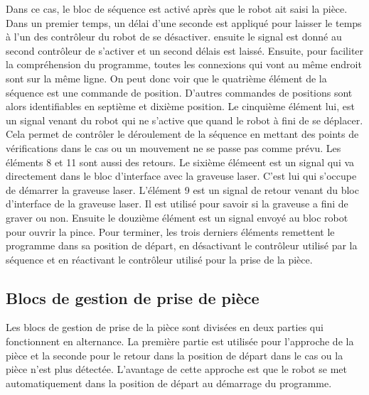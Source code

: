 Dans ce cas, le bloc de séquence est activé après que le robot ait saisi la pièce. Dans un premier temps, un délai d'une seconde est appliqué pour laisser le temps à l'un des contrôleur du robot de se désactiver. ensuite le signal est donné au second contrôleur de s'activer et un second délais est laissé. Ensuite, pour faciliter la compréhension du programme, toutes les connexions qui vont au même endroit sont sur la même ligne. On peut donc voir que le quatrième élément de la séquence est une commande de position. D'autres commandes de positions sont alors identifiables en septième et dixième position. Le cinquième élément lui, est un signal venant du robot qui ne s'active que quand le robot à fini de se déplacer. Cela permet de contrôler le déroulement de la séquence en mettant des points de vérifications dans le cas ou un mouvement ne se passe pas comme prévu. Les éléments 8 et 11 sont aussi des retours. Le sixième élémeent est un signal qui va directement dans le bloc d'interface avec la graveuse laser. C'est lui qui s'occupe de démarrer la graveuse laser. L'élément 9 est un signal de retour venant du bloc d'interface de la graveuse laser. Il est utilisé pour savoir si la graveuse a fini de graver ou non. Ensuite le douzième élément est un signal envoyé au bloc robot pour ouvrir la pince. Pour terminer, les trois derniers éléments remettent le programme dans sa position de départ, en désactivant le contrôleur utilisé par la séquence et en réactivant le contrôleur utilisé pour la prise de la pièce.

\subsection{Blocs de gestion de prise de pièce}

Les blocs de gestion de prise de la pièce sont divisées en deux parties qui fonctionnent en alternance. La première partie est utilisée pour l'approche de la pièce et la seconde pour le retour dans la position de départ dans le cas ou la pièce n'est plus détectée. L'avantage de cette approche est que le robot se met automatiquement dans la position de départ au démarrage du programme.

